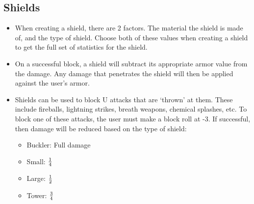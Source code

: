 \documentclass[twoside]{book}
\begin{document}
    

\subsection{Shields}
    
\begin{itemize}
      
  \item   When creating a shield, there are 2 factors. The
                 material the shield is made of, and the type of shield.
                 Choose both of these values when creating a shield to
                 get the full set of statistics for the shield. 
  \item   On a successful block, a shield will subtract its
                 appropriate armor value from the damage. Any damage that
                 penetrates the shield will then be applied against the
                 user's armor. 
  \item   Shields can be used to block U attacks that are
                `thrown' at them. These include fireballs,
                lightning strikes, breath weapons, chemical splashes,
                etc. To block one of these attacks, the user must make a
                block roll at -3. If successful, then damage will be
                reduced based on the type of shield:
                
\begin{itemize}
      
  \item   Buckler: Full damage 
  \item   Small: \begin{math}{{ 1 }\over{ 4
                   }}\end{math}
                  
  \item   Large: \begin{math}{{ 1 }\over{ 2
                   }}\end{math}
                  
  \item   Tower: \begin{math}{{ 3 }\over{ 4
                   }}\end{math}
                  
\end{itemize}
    
              
\end{itemize}
  
\end{document}
